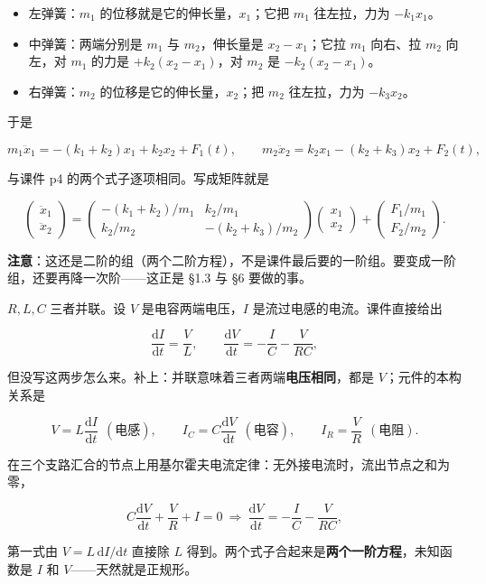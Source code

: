 \documentclass[11pt]{ctexart}
\newcommand{\mat}[1]{\begin{pmatrix}#1\end{pmatrix}}
\begin{document}
\begin{itemize}
  \item 左弹簧：$m_1$ 的位移就是它的伸长量，$x_1$；它把 $m_1$ 往左拉，力为 $-k_1x_1$。
  \item 中弹簧：两端分别是 $m_1$ 与 $m_2$，伸长量是 $x_2-x_1$；它拉 $m_1$ 向右、拉 $m_2$ 向左，对 $m_1$ 的力是 $+k_2(x_2-x_1)$，对 $m_2$ 是 $-k_2(x_2-x_1)$。
  \item 右弹簧：$m_2$ 的位移是它的伸长量，$x_2$；把 $m_2$ 往左拉，力为 $-k_3x_2$。
\end{itemize}

于是

\[
m_1\ddot x_1=-(k_1+k_2)x_1+k_2x_2+F_1(t),\qquad
m_2\ddot x_2=k_2x_1-(k_2+k_3)x_2+F_2(t),
\]

与课件 p4 的两个式子逐项相同。写成矩阵就是

\[
\mat{\ddot x_1\\[2pt]\ddot x_2}
=\mat{-(k_1+k_2)/m_1 & k_2/m_1\\[3pt] k_2/m_2 & -(k_2+k_3)/m_2}
\mat{x_1\\[2pt]x_2}+\mat{F_1/m_1\\[2pt]F_2/m_2}.
\]

\textbf{注意}：这还是二阶的组（两个二阶方程），不是课件最后要的一阶组。要变成一阶组，还要再降一次阶——这正是 §1.3 与 §6 要做的事。


$R,L,C$ 三者并联。设 $V$ 是电容两端电压，$I$ 是流过电感的电流。课件直接给出

\[
\frac{\mathrm{d}I}{\mathrm{d}t}=\frac{V}{L},\qquad
\frac{\mathrm{d}V}{\mathrm{d}t}=-\frac{I}{C}-\frac{V}{RC},
\]

但没写这两步怎么来。补上：并联意味着三者两端\textbf{电压相同}，都是 $V$；元件的本构关系是

\[
V=L\frac{\mathrm{d}I}{\mathrm{d}t}\ \ (\text{电感}),\qquad
I_C=C\frac{\mathrm{d}V}{\mathrm{d}t}\ \ (\text{电容}),\qquad
I_R=\frac{V}{R}\ \ (\text{电阻}).
\]

在三个支路汇合的节点上用基尔霍夫电流定律：无外接电流时，流出节点之和为零，

\[
C\frac{\mathrm{d}V}{\mathrm{d}t}+\frac{V}{R}+I=0
\ \Longrightarrow\
\frac{\mathrm{d}V}{\mathrm{d}t}=-\frac{I}{C}-\frac{V}{RC},
\]

第一式由 $V=L\,\mathrm{d}I/\mathrm{d}t$ 直接除 $L$ 得到。两个式子合起来是\textbf{两个一阶方程}，未知函数是 $I$ 和 $V$——天然就是正规形。
\end{document}
